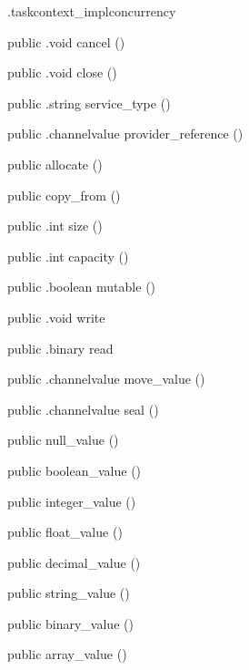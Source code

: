 \begin{CrexxClass}{.taskcontext\_impl}{concurrency}
\begin{Members}
    \Method
      {public}
      {.void}
      {cancel}
      {()}

    \Method
      {public}
      {.void}
      {close}
      {()}

    \Method
      {public}
      {.string}
      {service\_type}
      {()}

    \Method
      {public}
      {.channelvalue}
      {provider\_reference}
      {()}

    \Factory
      {public}
      {allocate}
      {()}

    \Factory
      {public}
      {copy\_from}
      {()}

    \Method
      {public}
      {.int}
      {size}
      {()}

    \Method
      {public}
      {.int}
      {capacity}
      {()}

    \Method
      {public}
      {.boolean}
      {mutable}
      {()}

    \Method
      {public}
      {.void}
      {write}
      {}

    \Method
      {public}
      {.binary}
      {read}
      {}

    \Method
      {public}
      {.channelvalue}
      {move\_value}
      {()}

    \Method
      {public}
      {.channelvalue}
      {seal}
      {()}

    \Factory
      {public}
      {null\_value}
      {()}

    \Factory
      {public}
      {boolean\_value}
      {()}

    \Factory
      {public}
      {integer\_value}
      {()}

    \Factory
      {public}
      {float\_value}
      {()}

    \Factory
      {public}
      {decimal\_value}
      {()}

    \Factory
      {public}
      {string\_value}
      {()}

    \Factory
      {public}
      {binary\_value}
      {()}

    \Factory
      {public}
      {array\_value}
      {()}


\end{Members}
\end{CrexxClass}
